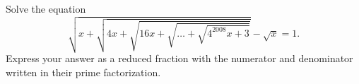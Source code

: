 Solve the equation
\[ \sqrt {x + \sqrt {4x + \sqrt {16x + \sqrt {\dotsc + \sqrt {4^{2008}x + 3}}}}} - \sqrt {x} = 1.
\]
Express your answer as a reduced fraction with the numerator and denominator written in their prime factorization.
